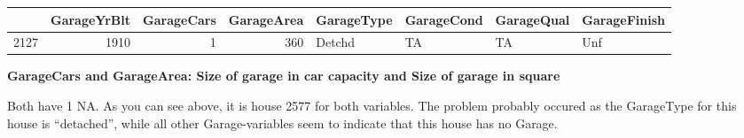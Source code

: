 \documentclass[]{article}
\newenvironment{Shaded}{\begin{snugshade}}{\end{snugshade}}
\newcommand{\KeywordTok}[1]{\textcolor[rgb]{0.13,0.29,0.53}{\textbf{#1}}}
\newcommand{\DecValTok}[1]{\textcolor[rgb]{0.00,0.00,0.81}{#1}}
\newcommand{\StringTok}[1]{\textcolor[rgb]{0.31,0.60,0.02}{#1}}
\newcommand{\CommentTok}[1]{\textcolor[rgb]{0.56,0.35,0.01}{\textit{#1}}}
\newcommand{\OperatorTok}[1]{\textcolor[rgb]{0.81,0.36,0.00}{\textbf{#1}}}
\newcommand{\NormalTok}[1]{#1}
\begin{document}
\begin{Shaded}
\end{Shaded}

\begin{longtable}[]{@{}lrrrllll@{}}
\toprule
& GarageYrBlt & GarageCars & GarageArea & GarageType & GarageCond &
GarageQual & GarageFinish\tabularnewline
\midrule
\endhead
2127 & 1910 & 1 & 360 & Detchd & TA & TA & Unf\tabularnewline
\bottomrule
\end{longtable}

\textbf{GarageCars and GarageArea: Size of garage in car capacity and
Size of garage in square}

Both have 1 NA. As you can see above, it is house 2577 for both
variables. The problem probably occured as the GarageType for this house
is ``detached'', while all other Garage-variables seem to indicate that
this house has no Garage.
\end{document}
